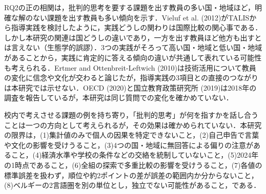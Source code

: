 \documentclass[a4paper,10pt,twocolumn]{ltjsarticle}
\begin{document}
RQ2の正の相関は，批判的思考を要する課題を出す教員の多い国・地域ほど，明確な解のない課題を出す教員も多い傾向を示す．Vieluf et al. (2012)がTALISから指導実践を検討したように，実践どうしの関わりは国際比較の関心事である．しかし本研究の関連は国どうしの違いであり，一方を出す教員ほど他方も出すとは言えない（生態学的誤謬）．3つの実践がそろって高い国・地域と低い国・地域があることから，実践に肯定的に答える傾向の違いが共通して表れている可能性も考えられる．Ertmer and Ottenbreit-Leftwich (2010)は技術活用について教員の変化に信念や文化が交わると論じたが，指導実践の3項目との直接のつながりは本研究では示せない．OECD (2020)と国立教育政策研究所 (2019)は2018年の調査を報告しているが，本研究は同じ質問での変化を確かめていない．

校内で考えさせる課題の例を持ち寄り，「批判的思考」が何を指すかを話し合うことは一つの方向として考えられるが，その効果は確かめられていない．本研究の限界は，(1)集計値のみで個人の因果を特定できないこと，(2)自己申告で言葉や文化の影響を受けうること，(3)4つの国・地域に無回答による偏りの注意があること，(4)経済水準や学校の条件などの交絡を統制していないこと，(5)2024年の1時点であること，(6)全組の探索で多重比較の影響を受けうること，(7)各値の標準誤差を扱わず，順位や約2ポイントの差が誤差の範囲内か分からないこと，(8)ベルギーの2言語圏を別の単位とし，独立でない可能性があること，である．
\end{document}
